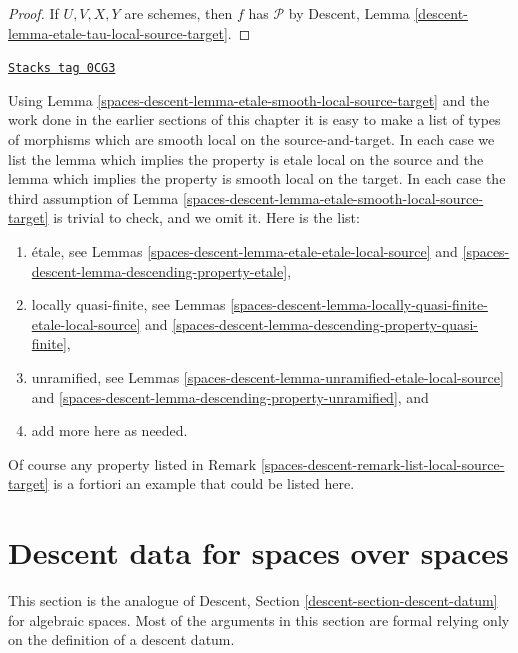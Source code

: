\begin{proof}
\medskip\noindent
If $U, V, X, Y$ are schemes, then $f$ has $\mathcal{P}$
by Descent, Lemma \ref{descent-lemma-etale-tau-local-source-target}.
\end{proof}

\begin{remark}
\label{spaces-descent-remark-list-etale-smooth-local-source-target}
\href{https://stacks.math.columbia.edu/tag/0CG3}{\texttt{Stacks tag 0CG3}}

Using Lemma \ref{spaces-descent-lemma-etale-smooth-local-source-target}
and the work done in the earlier sections of this chapter it is easy
to make a list of types of morphisms which are smooth local on the
source-and-target. In each case we list the lemma which implies
the property is etale local on the source and the lemma which implies
the property is smooth local on the target. In each case the third assumption
of Lemma \ref{spaces-descent-lemma-etale-smooth-local-source-target}
is trivial to check, and we omit it. Here is the list:
\begin{enumerate}
\item \'etale, see
Lemmas \ref{spaces-descent-lemma-etale-etale-local-source} and
\ref{spaces-descent-lemma-descending-property-etale},
\item locally quasi-finite, see
Lemmas \ref{spaces-descent-lemma-locally-quasi-finite-etale-local-source} and
\ref{spaces-descent-lemma-descending-property-quasi-finite},
\item unramified, see
Lemmas \ref{spaces-descent-lemma-unramified-etale-local-source} and
\ref{spaces-descent-lemma-descending-property-unramified}, and
\item add more here as needed.
\end{enumerate}
Of course any property listed in
Remark \ref{spaces-descent-remark-list-local-source-target}
is a fortiori an example that could be listed here.
\end{remark}

\section{Descent data for spaces over spaces}
\label{spaces-descent-section-descent-datum}
This section is the analogue of Descent, Section
\ref{descent-section-descent-datum} for algebraic spaces.
Most of the arguments in this section are formal relying only
on the definition of a descent datum.

